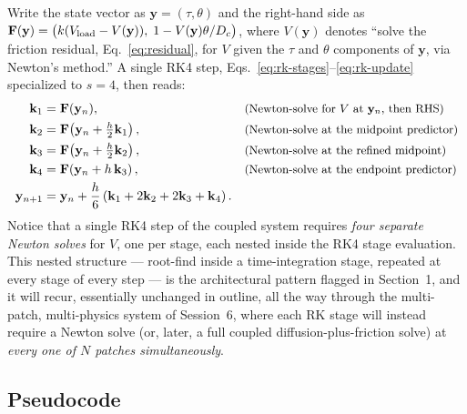 Write the state vector as $\mathbf y = (\tau, \theta)$ and the right-hand side as $\mathbf F(\mathbf y) = \big(k(V_{\mathrm{load}} - V(\mathbf y)),\; 1 - V(\mathbf y)\theta/D_c\big)$, where $V(\mathbf y)$ denotes ``solve the friction residual, Eq.~\eqref{eq:residual}, for $V$ given the $\tau$ and $\theta$ components of $\mathbf y$, via Newton's method.'' A single RK4 step, Eqs.~\eqref{eq:rk-stages}--\eqref{eq:rk-update} specialized to $s=4$, then reads:
\begin{align}
\mathbf k_1 &= \mathbf F(\mathbf y_n), & &\text{\small (Newton-solve for $V$ at $\mathbf y_n$, then RHS)}\\
\mathbf k_2 &= \mathbf F\!\left(\mathbf y_n + \tfrac{h}{2}\mathbf k_1\right), & &\text{\small (Newton-solve at the midpoint predictor)}\\
\mathbf k_3 &= \mathbf F\!\left(\mathbf y_n + \tfrac{h}{2}\mathbf k_2\right), & &\text{\small (Newton-solve at the refined midpoint)}\\
\mathbf k_4 &= \mathbf F\!\left(\mathbf y_n + h\,\mathbf k_3\right), & &\text{\small (Newton-solve at the endpoint predictor)}\\
\mathbf y_{n+1} &= \mathbf y_n + \frac{h}{6}\left(\mathbf k_1+2\mathbf k_2+2\mathbf k_3+\mathbf k_4\right).
\end{align}
Notice that a single RK4 step of the coupled system requires \emph{four separate Newton solves} for $V$, one per stage, each nested inside the RK4 stage evaluation. This nested structure --- root-find inside a time-integration stage, repeated at every stage of every step --- is the architectural pattern flagged in Section~1, and it will recur, essentially unchanged in outline, all the way through the multi-patch, multi-physics system of Session~6, where each RK stage will instead require a Newton solve (or, later, a full coupled diffusion-plus-friction solve) at \emph{every one of $N$ patches simultaneously}.

\subsection{Pseudocode}

